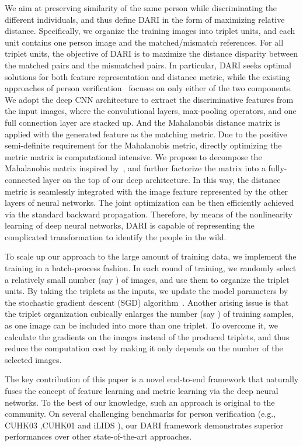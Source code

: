 \documentclass[letterpaper]{article}
\begin{document}
We aim at preserving similarity of the same person while discriminating the different individuals, and thus define DARI in the form of maximizing relative distance. Specifically, we organize the training images into triplet units, and each unit contains one person image and the matched/mismatch references. For all triplet units, the objective of DARI is to maximize the distance disparity between the matched pairs and the mismatched pairs. In particular, DARI seeks optimal solutions for both feature representation and distance metric, while the existing approaches of person verification~\cite{xu2013human,liu2012person} focuses on only either of the two components. We adopt the deep CNN architecture to extract the discriminative features from the input images, where the convolutional layers, max-pooling operators, and one full connection layer are stacked up. And the Mahalanobis distance matrix is applied with the generated feature as the matching metric. Due to the positive semi-definite requirement for the Mahalanobis metric, directly optimizing the metric matrix is computational intensive. We propose to decompose the Mahalanobis matrix inspired by~\cite{mignon2012pcca}, and further factorize the matrix into a fully-connected layer on the top of our deep architecture. In this way, the distance metric is seamlessly integrated with the image feature represented by the other layers of neural networks. The joint optimization can be then efficiently achieved via the standard backward propagation. Therefore, by means of the nonlinearity learning of deep neural networks, DARI is capable of representing the complicated transformation to identify the people in the wild.

To scale up our approach to the large amount of training data, we implement the training in a batch-process fashion. In each round of training, we randomly select a relatively small number (say ) of images, and use them to organize the triplet units. By taking the triplets as the inputs, we update the model parameters by the stochastic gradient descent (SGD) algorithm~\cite{lecun1998gradient}. Another arising issue is that the triplet organization cubically enlarges the number (say ) of training samples, as one image can be included into more than one triplet. To overcome it, we calculate the gradients on the images instead of the produced triplets, and thus reduce the computation cost by making it only depends on the number of the selected images.

The key contribution of this paper is a novel end-to-end framework that naturally fuses the concept of feature learning and metric learning via the deep neural networks. To the best of our knowledge, such an approach is original to the community. On several challenging benchmarks for person verification (e.g., CUHK03 \cite{li2014deepreid},CUHK01\cite{li2012human} and iLIDS \cite{zheng2009people}), our DARI framework demonstrates superior performances over other state-of-the-art approaches.
\end{document}
